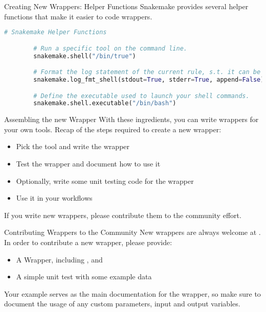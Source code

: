 \begin{frame}[fragile]{Creating New Wrappers: Helper Functions}
    Snakemake provides several helper functions that make it easier to code wrappers.
    \begin{lstlisting}[language=Python,style=Python,gobble=8]
        # Snakemake Helper Functions

        # Run a specific tool on the command line.
        snakemake.shell("/bin/true")

        # Format the log statement of the current rule, s.t. it can be applied to a shell command.
        snakemake.log_fmt_shell(stdout=True, stderr=True, append=False)

        # Define the executable used to launch your shell commands.
        snakemake.shell.executable("/bin/bash")
    \end{lstlisting}
\end{frame}

\begin{frame}{Assembling the new Wrapper}
    With these ingredients, you can write wrappers for your own tools.
    Recap of the steps required to create a new wrapper:
    \begin{itemize}
        \item Pick the tool and write the wrapper
        \item Test the wrapper and document how to use it
        \item Optionally, write some unit testing code for the wrapper
        \item Use it in your workflows
    \end{itemize}
    \begin{docs}
        If you write new wrappers, please contribute them to the community effort.
    \end{docs}
\end{frame}

\begin{frame}{Contributing Wrappers to the Community}
    New wrappers are always welcome at .
    In order to contribute a new wrapper, please provide:
    \begin{itemize}
        \item A Wrapper, including ,  and 
        \item A simple unit test with some example data
    \end{itemize}
    \begin{hint}
        Your example serves as the main documentation for the wrapper, so make sure to document
        the usage of any custom parameters, input and output variables.
    \end{hint}
\end{frame}
